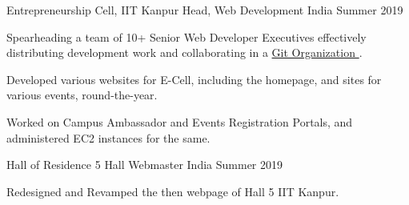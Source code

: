 \begin{cventries}

  \cventry
  {Entrepreneurship Cell, IIT Kanpur}
  {Head, Web Development}
  {India}
  {Summer 2019}
  {
    \begin{cvitems}
    \item Spearheading a team of 10+ Senior Web Developer Executives effectively distributing development work and collaborating in a \href{https://github.com/ECell-IITK/}{Git Organization \ExternalLink}.
    \item Developed various websites for E-Cell, including the homepage, and sites for various events, round-the-year.
    \item Worked on Campus Ambassador and Events Registration Portals, and administered EC2 instances for the same.
    \end{cvitems}
  }

  \cventry
  {Hall of Residence 5}
  {Hall Webmaster}
  {India}
  {Summer 2019}
  {
    \begin{cvitems}
    \item Redesigned and Revamped the then webpage of Hall 5 IIT Kanpur. 
    \end{cvitems}
  }
\end{cventries}



